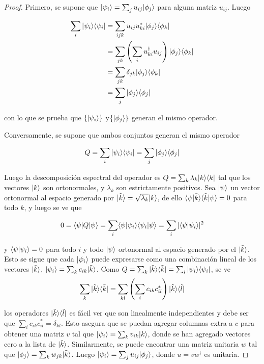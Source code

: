 \begin{proof}
	
	Primero, se supone que $|\psi_i\rangle= \sum_{j}u_{ij}|\phi_j\rangle$ para alguna matriz $u_{ij}$. Luego
	
	
	\begin{equation*}
		\begin{split}
			\sum_{i}|\psi_i\rangle \langle \psi_i|&=\sum_{ijk}u_{ij}u_{ki}^*|\phi_j\rangle \langle \phi_k|\\
			&=\sum_{jk}\left(\sum_i u_{ki}^\dagger u_{ij}\right) |\phi_j\rangle \langle \phi_k|\\
			&=\sum_{jk}\delta_{jk}|\phi_j\rangle \langle \phi_k|\\
			&=\sum_{j} |\phi_j\rangle \langle \phi_j|\\
	\end{split}
	\end{equation*}
	
	con lo que se prueba que $\{|\psi_i\rangle\}$ y$ \{|\phi_j\rangle \}$ generan el mismo operador.
	
	
	
	Conversamente, se supone que ambos conjuntos generan el mismo operador
	
	\[Q=\sum_{i}|\psi_i\rangle \langle \psi_i|=\sum_{j} |\phi_j\rangle \langle \phi_j|\]
	
	Luego la  descomposición espectral del operador es $Q = \sum_k \lambda_k |k \rangle \langle k|$ tal que los vectores $ |k\rangle$ son ortonormales, y $\lambda_k$ son estrictamente  positivos. Sea $|\psi\rangle$  un vector ortonormal al espacio generado por $|\tilde{k}\rangle=\sqrt{\lambda_k}|k\rangle$, de ello $\langle \psi|\tilde{k}\rangle \langle \tilde{k}|\psi\rangle=0$ para todo $ k$, y luego se ve que
	
	\[0=\langle \psi |Q|\psi\rangle=\sum_{i}\langle\psi|\psi_i\rangle \langle \psi_i|\psi \rangle =\sum_i |\langle\psi|\psi_i\rangle|^2 \]
	
	y $\langle\psi|\psi_i\rangle=0$ para todo $i$ y todo $|\psi \rangle$ ortonormal al espacio generado  por el $|\tilde{k}\rangle$. Esto se sigue que cada $|\psi_i\rangle $ puede expresarse como una combinación lineal de los vectores  $|\tilde{k}\rangle$, $|\psi_i\rangle=\sum_k c_{ik} |\tilde{k}\rangle$. Como  $Q=\sum_k  |\tilde{k}\rangle \langle \tilde{k}|=\sum_{i}|\psi_i\rangle \langle\psi_i|$, se ve
	\[\sum_k |\tilde{k}\rangle \langle \tilde{k}|=\sum_{kl} \left(\sum_i c_{ik}c_{il}^{*}\right)|\tilde{k}\rangle \langle \tilde{l}|\]
	
	los operadores $|\tilde{k} \rangle \langle \tilde{l}|$ es fácil ver  que son linealmente independientes y debe ser que $\sum_i c_{ik}c_{il}^{*}=\delta_{kl}$. Esto asegura que se puedan agregar columnas extra a $c$ para obtener una matriz $v$ tal que $|\psi_i\rangle=\sum_{k}v_{ik}|k\rangle  $, donde se han agregado  vectores cero a la lista de $|\tilde{k}\rangle$. Similarmente, se puede encontrar una matriz unitaria $w$ tal que $|\phi_j\rangle=\sum_{k}w_{jk}|\tilde{k}\rangle$. Luego $|\psi_i\rangle=\sum_j u_{ij}|\phi_j\rangle$, donde  $u=vw^\dagger$ es unitaria. 
	\end{proof}

